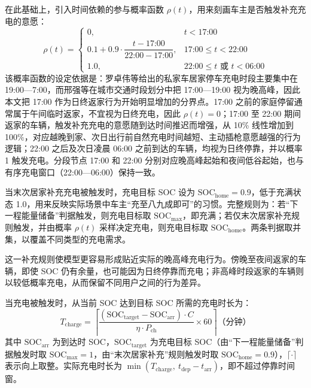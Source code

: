 \documentclass[10pt,a4paper]{article}
\numberwithin{equation}{section}
\numberwithin{table}{section}
\numberwithin{figure}{section}
\begin{document}
    在此基础上，引入时间依赖的参与概率函数 $\rho(t)$，用来刻画车主是否触发补充充电的意愿：
    \begin{equation}
    \label{eq:participation_prob}
    \rho(t) =
    \begin{cases}
        0, & t < 17\text{:}00 \\
        0.1 + 0.9 \cdot \dfrac{t - 17\text{:}00}{22\text{:}00 - 17\text{:}00}, & 17\text{:}00 \leq t < 22\text{:}00 \\
        1.0, & 22\text{:}00 \leq t \text{ 或 } t < 06\text{:}00
    \end{cases}
    \end{equation}
    该概率函数的设定依据是：罗卓伟等\supercite{ref8}给出的私家车居家停车充电时段主要集中在 19:00—7:00，而邢强等\supercite{ref21}在城市交通时段划分中把 17:00—19:00 视为晚高峰，因此本文把 17:00 作为日终返家行为开始明显增加的分界点。17:00 之前的家庭停留通常属于午间临时返家，不宜视为日终充电，因此 $\rho(t) = 0$；17:00 至 22:00 期间返家的车辆，触发补充充电的意愿随到达时间推迟而增强，从 10\% 线性增加到 100\%，对应越晚到家、次日出行前自然充电时间越短、主动插枪意愿越强的行为逻辑；22:00 之后及次日凌晨 06:00 之前到达的车辆，均视为日终停靠，并以概率 1 触发充电。分段节点 17:00 和 22:00 分别对应晚高峰起始和夜间低谷起始，也与有序充电窗口（22:00—06:00）保持一致。

    当末次居家补充充电被触发时，充电目标 SOC 设为 $\text{SOC}_{\text{home}} = 0.9$，低于充满状态 1.0，用来反映实际场景中车主“充至八九成即可”的习惯。完整规则为：若“下一程能量储备”判据触发，则充电目标取 $\text{SOC}_{\max}$，即充满；若仅末次居家补充规则触发，并由概率 $\rho(t)$ 采样决定充电，则充电目标取 $\text{SOC}_{\text{home}}$。两条判据取并集，以覆盖不同类型的充电需求。

    这一补充规则使模型更容易形成贴近实际的晚高峰充电行为。傍晚至夜间返家的车辆，即使 SOC 仍有余量，也可能因为日终停靠而充电；非高峰时段返家的车辆则以较低概率充电，从而保留不同用户之间的行为差异。

    当充电被触发时，从当前 SOC 达到目标 SOC 所需的充电时长为：
    \begin{equation}
    \label{eq:charge_duration}
    T_{\text{charge}} = \left\lceil\frac{(\text{SOC}_{\text{target}} - \text{SOC}_{\text{arr}}) \cdot C}{\eta \cdot P_{\text{ch}}} \times 60\right\rceil \text{（分钟）}
    \end{equation}
    其中 $\text{SOC}_{\text{arr}}$ 为到达时 SOC，$\text{SOC}_{\text{target}}$ 为充电目标 SOC（由“下一程能量储备”判据触发时取 $\text{SOC}_{\max} = 1$，由“末次居家补充”规则触发时取 $\text{SOC}_{\text{home}} = 0.9$），$\lceil\cdot\rceil$ 表示向上取整。实际充电时长为 $\min(T_{\text{charge}},\ t_{\text{dep}} - t_{\text{arr}})$，即不超过停靠时间窗。
\end{document}
